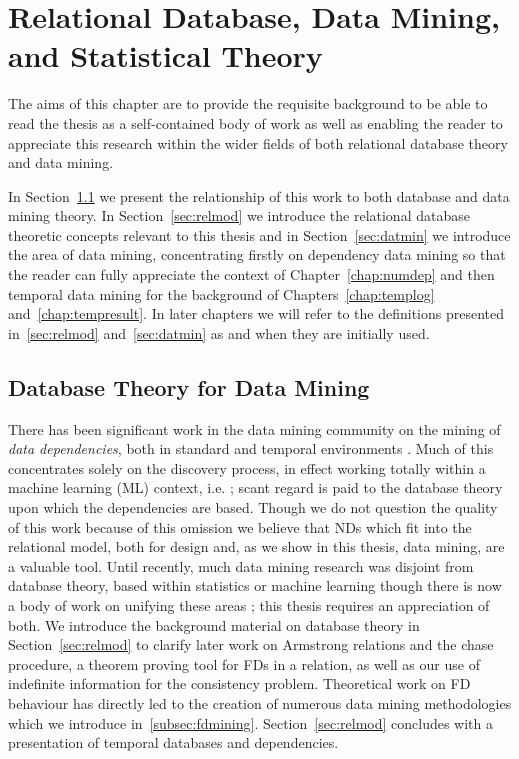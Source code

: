\chapter{Relational Database, Data Mining, and Statistical
Theory}\label{chap:review}

The aims of this chapter are to provide the requisite
background to be able to read the thesis as a self-contained body of
work as well as enabling the reader to appreciate this research within
the wider fields of both relational database theory and data mining.

In Section~\ref{sec:db_for_dm} we present the relationship of this
work to both database and data mining theory. 
In Section~\ref{sec:relmod} we introduce the relational database theoretic
concepts relevant to this thesis and in Section~\ref{sec:datmin}
we introduce the area of data mining, concentrating firstly on dependency data
mining so that the reader can fully appreciate the context of
Chapter~\ref{chap:numdep} and then temporal data mining for the
background of Chapters~\ref{chap:templog}
and~\ref{chap:tempresult}. In later chapters we will refer to 
the definitions presented in~\ref{sec:relmod} and~\ref{sec:datmin}
as and when they are initially used.

\section{Database Theory for Data Mining}\label{sec:db_for_dm}
There has been significant work in the data mining community on the
mining of {\em data dependencies}, both in standard \cite{psm93,km95} and
temporal environments \cite{bwj96}. Much of this concentrates solely
on the discovery process, in effect working totally within a machine
learning (ML) context, i.e. \cite{she91}; scant regard is paid to the
database theory upon which the dependencies are based. Though we
do not question the quality of this work because of this omission we
believe that NDs which fit into the
relational model, both for design and, as we show in this thesis, data
mining, are a valuable tool. Until recently, much data mining research
was disjoint from database 
theory, based within statistics or machine learning though there is
now a body of work on unifying these areas \cite{cha98}; this thesis
requires an appreciation of both.
We introduce the background material on
database theory in Section~\ref{sec:relmod} to clarify
later work on Armstrong relations and the chase procedure, a
theorem proving tool for FDs in a relation, as well as our use of indefinite
information for the consistency problem. Theoretical work on FD
behaviour has directly led to the 
creation of numerous data mining methodologies which we introduce
in~\ref{subsec:fdmining}.  Section~\ref{sec:relmod} concludes with a
presentation of 
temporal databases and dependencies.

